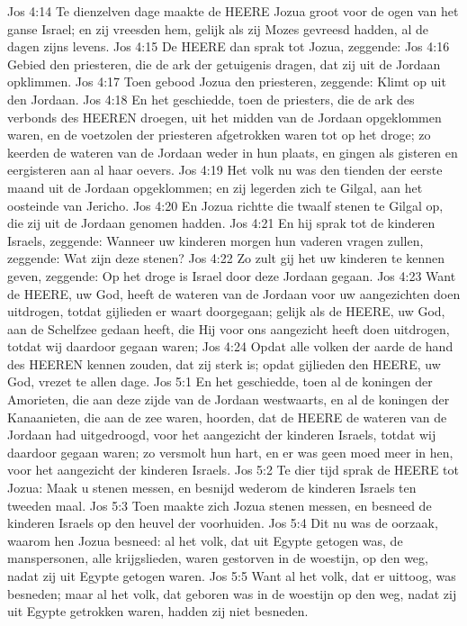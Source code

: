Jos 4:14  Te dienzelven dage maakte de HEERE Jozua groot voor de ogen van het ganse Israel; en zij vreesden hem, gelijk als zij Mozes gevreesd hadden, al de dagen zijns levens.
Jos 4:15  De HEERE dan sprak tot Jozua, zeggende:
Jos 4:16  Gebied den priesteren, die de ark der getuigenis dragen, dat zij uit de Jordaan opklimmen.
Jos 4:17  Toen gebood Jozua den priesteren, zeggende: Klimt op uit den Jordaan.
Jos 4:18  En het geschiedde, toen de priesters, die de ark des verbonds des HEEREN droegen, uit het midden van de Jordaan opgeklommen waren, en de voetzolen der priesteren afgetrokken waren tot op het droge; zo keerden de wateren van de Jordaan weder in hun plaats, en gingen als gisteren en eergisteren aan al haar oevers.
Jos 4:19  Het volk nu was den tienden der eerste maand uit de Jordaan opgeklommen; en zij legerden zich te Gilgal, aan het oosteinde van Jericho.
Jos 4:20  En Jozua richtte die twaalf stenen te Gilgal op, die zij uit de Jordaan genomen hadden.
Jos 4:21  En hij sprak tot de kinderen Israels, zeggende: Wanneer uw kinderen morgen hun vaderen vragen zullen, zeggende: Wat zijn deze stenen?
Jos 4:22  Zo zult gij het uw kinderen te kennen geven, zeggende: Op het droge is Israel door deze Jordaan gegaan.
Jos 4:23  Want de HEERE, uw God, heeft de wateren van de Jordaan voor uw aangezichten doen uitdrogen, totdat gijlieden er waart doorgegaan; gelijk als de HEERE, uw God, aan de Schelfzee gedaan heeft, die Hij voor ons aangezicht heeft doen uitdrogen, totdat wij daardoor gegaan waren;
Jos 4:24  Opdat alle volken der aarde de hand des HEEREN kennen zouden, dat zij sterk is; opdat gijlieden den HEERE, uw God, vrezet te allen dage.
Jos 5:1  En het geschiedde, toen al de koningen der Amorieten, die aan deze zijde van de Jordaan westwaarts, en al de koningen der Kanaanieten, die aan de zee waren, hoorden, dat de HEERE de wateren van de Jordaan had uitgedroogd, voor het aangezicht der kinderen Israels, totdat wij daardoor gegaan waren; zo versmolt hun hart, en er was geen moed meer in hen, voor het aangezicht der kinderen Israels.
Jos 5:2  Te dier tijd sprak de HEERE tot Jozua: Maak u stenen messen, en besnijd wederom de kinderen Israels ten tweeden maal.
Jos 5:3  Toen maakte zich Jozua stenen messen, en besneed de kinderen Israels op den heuvel der voorhuiden.
Jos 5:4  Dit nu was de oorzaak, waarom hen Jozua besneed: al het volk, dat uit Egypte getogen was, de manspersonen, alle krijgslieden, waren gestorven in de woestijn, op den weg, nadat zij uit Egypte getogen waren.
Jos 5:5  Want al het volk, dat er uittoog, was besneden; maar al het volk, dat geboren was in de woestijn op den weg, nadat zij uit Egypte getrokken waren, hadden zij niet besneden.
